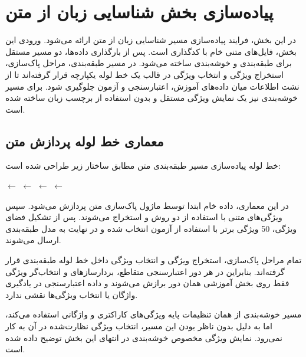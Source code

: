 \documentclass[12pt,a4paper,oneside]{report}
\begin{document}
\section{پیاده‌سازی بخش شناسایی زبان از متن}

در این بخش، فرایند پیاده‌سازی مسیر شناسایی زبان از متن ارائه می‌شود. ورودی این بخش، فایل‌های متنی خام با کدگذاری
است. پس از بارگذاری داده‌ها، دو مسیر مستقل برای طبقه‌بندی و خوشه‌بندی ساخته می‌شود. در مسیر طبقه‌بندی، مراحل پاک‌سازی، استخراج ویژگی و انتخاب ویژگی در قالب یک خط لوله یکپارچه قرار گرفته‌اند تا از نشت اطلاعات میان داده‌های آموزش، اعتبارسنجی و آزمون جلوگیری شود. برای مسیر خوشه‌بندی نیز یک نمایش ویژگی مستقل و بدون استفاده از برچسب زبان ساخته شده است.


\subsection{معماری خط لوله پردازش متن}

خط لوله پیاده‌سازی مسیر طبقه‌بندی متن مطابق ساختار زیر طراحی شده است:

\begin{center}
$\longleftarrow$
$\longleftarrow$
$\longleftarrow$
$\longleftarrow$
\end{center}

در این معماری، داده خام ابتدا توسط ماژول پاک‌سازی متن پردازش می‌شود. سپس ویژگی‌های متنی با استفاده از دو روش
و
استخراج می‌شوند. پس از تشکیل فضای ویژگی، 50 ویژگی برتر با استفاده از آزمون
انتخاب شده و در نهایت به مدل طبقه‌بندی ارسال می‌شوند.

تمام مراحل پاک‌سازی، استخراج ویژگی و انتخاب ویژگی داخل خط لوله طبقه‌بندی قرار گرفته‌اند. بنابراین در هر دور اعتبارسنجی متقاطع، بردارسازهای
و انتخاب‌گر ویژگی فقط روی بخش آموزشی همان دور برازش می‌شوند و داده اعتبارسنجی در یادگیری واژگان یا انتخاب ویژگی‌ها نقشی ندارد.

مسیر خوشه‌بندی از همان تنظیمات پایه ویژگی‌های کاراکتری و واژگانی استفاده می‌کند، اما به دلیل بدون ناظر بودن این مسیر، انتخاب ویژگی نظارت‌شده
در آن به کار نمی‌رود. نمایش ویژگی مخصوص خوشه‌بندی در انتهای این بخش توضیح داده شده است.


\end{document}
